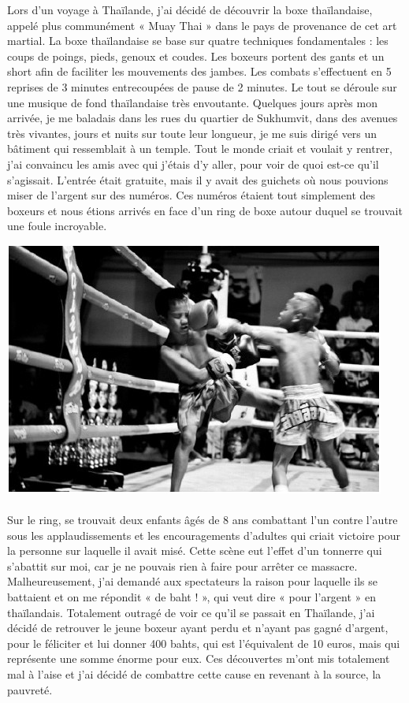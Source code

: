 Lors d'un voyage à Thaïlande, j'ai décidé de découvrir la boxe thaïlandaise,
appelé plus communément « Muay Thai » dans le pays de provenance de cet art
martial. La boxe thaïlandaise se base sur quatre techniques fondamentales :
les coups de poings, pieds, genoux et coudes. Les boxeurs portent des gants et
un short afin de faciliter les mouvements des jambes. Les combats s'effectuent
en 5 reprises de 3 minutes entrecoupées de pause de 2 minutes. Le tout se
déroule sur une musique de fond thaïlandaise très envoutante.  Quelques jours
après mon arrivée, je me baladais dans les rues du quartier de Sukhumvit, dans
des avenues très vivantes, jours et nuits sur toute leur longueur, je me suis
dirigé vers un bâtiment qui ressemblait à un temple. Tout le monde criait et
voulait y rentrer, j'ai convaincu les amis avec qui j'étais d'y aller, pour
voir de quoi est-ce qu'il s'agissait.  L'entrée était gratuite, mais il y avait
des guichets où nous pouvions miser de l'argent sur des numéros. Ces numéros
étaient tout simplement des boxeurs et nous étions arrivés en face d'un ring de
boxe autour duquel se trouvait une foule incroyable.

\begin{center}
\includegraphics[scale=0.7]{Thai2.jpg}
\end{center}

\paragraph{}
Sur le ring, se trouvait deux enfants âgés de 8 ans combattant l'un contre
l'autre sous les applaudissements et les encouragements d'adultes qui criait
victoire pour la personne sur laquelle il avait misé. Cette scène eut l'effet
d'un tonnerre qui s'abattit sur moi, car je ne pouvais rien à faire pour arrêter
ce massacre.  Malheureusement, j'ai demandé aux spectateurs la raison pour
laquelle ils se battaient et on me répondit « de baht ! », qui veut dire « pour
l'argent » en thaïlandais. Totalement outragé de voir ce qu'il se passait en
Thaïlande, j'ai décidé de retrouver le jeune boxeur ayant perdu et n'ayant pas
gagné d'argent, pour le féliciter et lui donner 400 bahts, qui est l'équivalent
de 10 euros, mais qui représente une somme énorme pour eux.  Ces découvertes
m'ont mis totalement mal à l'aise et j'ai décidé de combattre cette cause en
revenant à la source, la pauvreté.

